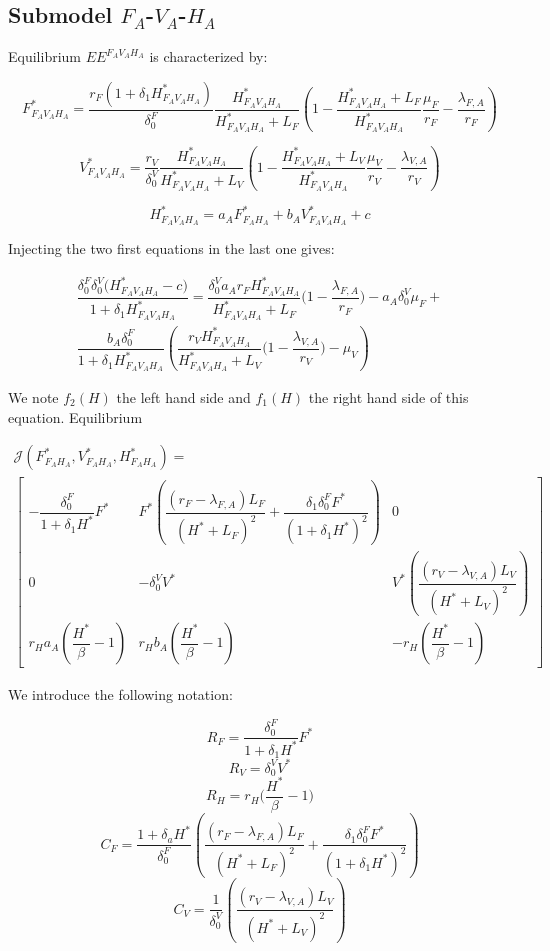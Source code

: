 \documentclass{article}
\newcommand{\lfa}{\lambda_{F, A}}
\newcommand{\lva}{\lambda_{V, A}}
\newcommand{\df}{\delta_0^F}
\newcommand{\dv}{\delta_0^V}
\begin{document}
\subsection{Submodel $F_A$-$V_A$-$H_A$}
Equilibrium $EE^{F_AV_AH_A}$ is characterized by:

$$
F^*_{F_AV_AH_A} = \dfrac{r_F(1+\delta_1 H^*_{F_AV_AH_A})}{\df}\dfrac{H^*_{F_AV_AH_A}}{H^*_{F_AV_AH_A} + L_F}\left(1 - \dfrac{H^*_{F_AV_AH_A} + L_F}{H^*_{F_AV_AH_A}}\dfrac{\mu_F}{r_F} - \dfrac{\lfa}{r_F}\right)
$$

$$
V^*_{F_AV_AH_A} = \dfrac{r_V}{\dv}\dfrac{H^*_{F_AV_AH_A}}{H^*_{F_AV_AH_A} + L_V}\left(1 - \dfrac{H^*_{F_AV_AH_A} + L_V}{H^*_{F_AV_AH_A}}\dfrac{\mu_V}{r_V} - \dfrac{\lva}{r_V}\right)
$$

$$
H^*_{F_AV_AH_A} = a_A F^*_{F_AH_A} + b_A V^*_{F_AV_AH_A} + c
$$

Injecting the two first equations in the last one gives:

\begin{multline}
\dfrac{\df \dv \Big(H^*_{F_AV_AH_A} -c\Big)}{1 + \delta_1 H^*_{F_AV_AH_A}} = \dfrac{\dv a_A r_F H^*_{F_AV_AH_A} }{H^*_{F_AV_AH_A} +L_F} \Big(1 - \dfrac{\lfa}{r_F} \Big) - a_A \dv \mu_F + \\
\dfrac{b_A \df}{1 + \delta_1 H^*_{F_AV_AH_A} } \left( \dfrac{ r_V H^*_{F_AV_AH_A} }{H^*_{F_AV_AH_A} +L_V} \Big(1 - \dfrac{\lva}{r_V} \Big) - \mu_V \right)
\end{multline}

We note $f_2(H)$ the left hand side and $f_1(H)$ the right hand side of this equation. Equilibrium 



\begin{multline}
\mathcal{J}(F^*_{F_AH_A}, V^*_{F_AH_A}, H^*_{F_AH_A}) = \\ \begin{bmatrix}
- \dfrac{\df}{1 + \delta_1 H^*}F^* & F^* \left( \dfrac{(r_F - \lfa)L_F}{(H^* + L_F)^2} + \dfrac{\delta_1 \df F^*}{(1 + \delta_1 H^*)^2} \right) & 0\\
0 & - \dv V^* & V^* \left( \dfrac{(r_V - \lva)L_V}{(H^* + L_V)^2} \right) \\
r_H a_A (\dfrac{H^*}{\beta} - 1)&r_H b_A (\dfrac{H^*}{\beta} - 1) & -r_H(\dfrac{H^*}{\beta} - 1)
\end{bmatrix}
\end{multline}

We introduce the following notation:

$$
R_F = \dfrac{\df}{1 + \delta_1 H^*} F^*
$$
$$
R_V = \dv V^*
$$
$$
R_H = r_H\Big(\dfrac{H^*}{\beta} - 1\Big)
$$
$$
C_F = \dfrac{1 + \delta_a H^*}{\df} \left( \dfrac{(r_F - \lfa)L_F}{(H^* + L_F)^2} + \dfrac{\delta_1 \df F^*}{(1 + \delta_1 H^*)^2} \right)
$$
$$C_V = \dfrac{1}{\dv} \left( \dfrac{(r_V - \lva)L_V}{(H^* + L_V)^2} \right) $$
\end{document}
